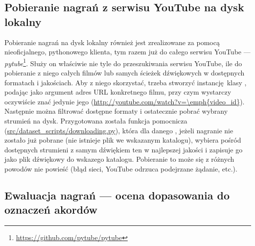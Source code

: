 \subsection{Pobieranie nagrań z serwisu YouTube na dysk lokalny}

Pobieranie nagrań na dysk lokalny również jest zrealizowane za pomocą nieoficjalnego, pythonowego klienta, tym razem już do całego serwisu YouTube --- \emph{pytube}\footnote{\url{https://github.com/pytube/pytube}}. Służy on właściwie nie tyle do przeszukiwania serwisu YouTube, ile do pobieranie z niego całych filmów lub samych ścieżek dźwiękowych w dostępnych formatach i jakościach. Aby z niego skorzystać, trzeba stworzyć instancję klasy , podając jako argument adres URL konkretnego filmu, przy czym wystarczy oczywiście znać jedynie jego  (\url{http://youtube.com/watch?v=\emph{video_id}}). Następnie można filtrować dostępne formaty i ostatecznie pobrać wybrany strumień na dysk. Przygotowana została funkcja pomocnicza (\url{src/dataset_scripts/downloading.py}), która dla danego , jeżeli nagranie nie zostało już pobrane (nie istnieje plik we wskazanym katalogu), wybiera pośród dostępnych strumieni z samym dźwiękiem ten w najlepszej jakości i zapisuje go jako plik dźwiękowy do wskazego katalogu. Pobieranie to może się z różnych powodów nie powieść (błąd sieci, YouTube odrzuca podejrzane żądanie, etc.).

\subsection{Ewaluacja nagrań --- ocena dopasowania do oznaczeń akordów}

